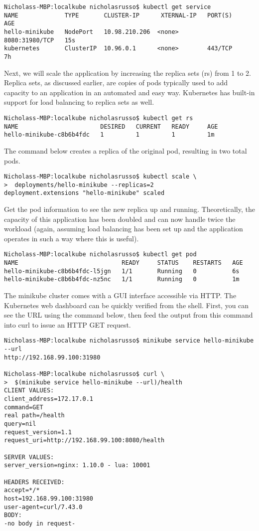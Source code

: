 \begin{verbatim}
Nicholass-MBP:localkube nicholasrusso$ kubectl get service
NAME             TYPE       CLUSTER-IP      XTERNAL-IP   PORT(S)          AGE
hello-minikube   NodePort   10.98.210.206  <none>        8080:31980/TCP   15s
kubernetes       ClusterIP  10.96.0.1      <none>        443/TCP          7h
\end{verbatim}

Next, we will scale the application by increasing the replica sets (rs) from 1
to 2. Replica sets, as discussed earlier, are copies of pods typically used to
add capacity to an application in an automated and easy way. Kubernetes has
built-in support for load balancing to replica sets as well.

\begin{verbatim}
Nicholass-MBP:localkube nicholasrusso$ kubectl get rs
NAME                       DESIRED   CURRENT   READY     AGE
hello-minikube-c8b6b4fdc   1         1         1         1m
\end{verbatim}

The command below creates a replica of the original pod, resulting in two total pods.

\begin{verbatim}
Nicholass-MBP:localkube nicholasrusso$ kubectl scale \
>  deployments/hello-minikube --replicas=2
deployment.extensions "hello-minikube" scaled
\end{verbatim}

Get the pod information to see the new replica up and running. Theoretically,
the capacity of this application has been doubled and can now handle twice the
workload (again, assuming load balancing has been set up and the application
operates in such a way where this is useful).

\begin{verbatim}
Nicholass-MBP:localkube nicholasrusso$ kubectl get pod
NAME                             READY     STATUS    RESTARTS   AGE
hello-minikube-c8b6b4fdc-l5jgn   1/1       Running   0          6s
hello-minikube-c8b6b4fdc-nz5nc   1/1       Running   0          1m
\end{verbatim}

The minikube cluster comes with a GUI interface accessible via HTTP. The
Kubernetes web dashboard can be quickly verified from the shell. First, you
can see the URL using the command below, then feed the output from this
command into curl to issue an HTTP GET request.

\begin{verbatim}
Nicholass-MBP:localkube nicholasrusso$ minikube service hello-minikube --url
http://192.168.99.100:31980

Nicholass-MBP:localkube nicholasrusso$ curl \
>  $(minikube service hello-minikube --url)/health
CLIENT VALUES:
client_address=172.17.0.1
command=GET
real path=/health
query=nil
request_version=1.1
request_uri=http://192.168.99.100:8080/health

SERVER VALUES:
server_version=nginx: 1.10.0 - lua: 10001

HEADERS RECEIVED:
accept=*/*
host=192.168.99.100:31980
user-agent=curl/7.43.0
BODY:
-no body in request-
\end{verbatim}

